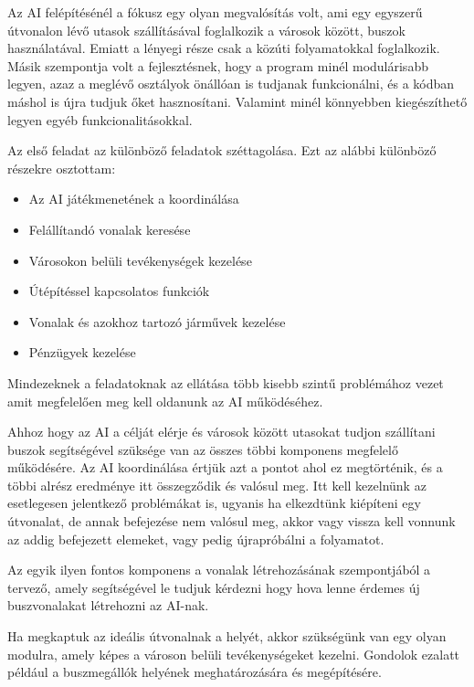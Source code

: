 
Az AI felépítésénél a fókusz egy olyan megvalósítás volt, ami egy egyszerű útvonalon lévő utasok szállításával foglalkozik a városok között, buszok használatával. Emiatt a lényegi része csak a közúti folyamatokkal foglalkozik. Másik szempontja volt a fejlesztésnek, hogy a program minél modulárisabb legyen, azaz a meglévő osztályok önállóan is tudjanak funkcionálni, és a kódban máshol is újra tudjuk őket hasznosítani. Valamint minél könnyebben kiegészíthető legyen egyéb funkcionalitásokkal.


Az első feladat az különböző feladatok széttagolása. Ezt az alábbi különböző részekre osztottam:

\begin{itemize}
	\item Az AI játékmenetének a koordinálása
	\item Felállítandó vonalak keresése
	\item Városokon belüli tevékenységek kezelése
	\item Útépítéssel kapcsolatos funkciók
	\item Vonalak és azokhoz tartozó járművek kezelése
	\item Pénzügyek kezelése
\end{itemize}

Mindezeknek a feladatoknak az ellátása több kisebb szintű problémához vezet amit megfelelően meg kell oldanunk az AI működéséhez.

Ahhoz hogy az AI a célját elérje és városok között utasokat tudjon szállítani buszok segítségével szüksége van az összes többi komponens megfelelő működésére. Az AI koordinálása értjük azt a pontot ahol ez megtörténik, és a többi alrész eredménye itt összegződik és valósul meg. Itt kell kezelnünk az esetlegesen jelentkező problémákat is, ugyanis ha elkezdtünk kiépíteni egy útvonalat, de annak befejezése nem valósul meg, akkor vagy vissza kell vonnunk az addig befejezett elemeket, vagy pedig újrapróbálni a folyamatot.

Az egyik ilyen fontos komponens a vonalak létrehozásának szempontjából a tervező, amely segítségével le tudjuk kérdezni hogy hova lenne érdemes új buszvonalakat létrehozni az AI-nak.

Ha megkaptuk az ideális útvonalnak a helyét, akkor szükségünk van egy olyan modulra, amely képes a városon belüli tevékenységeket kezelni. Gondolok ezalatt például a buszmegállók helyének meghatározására és megépítésére.

